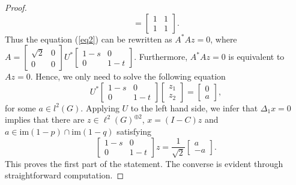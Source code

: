 \documentclass[a4paper,leqno,12pt]{article}
\numberwithin{equation}{section}
\theoremstyle{plain}
\theoremstyle{definition}
\theoremstyle{remark}
\begin{document}
\begin{proof}
\[		=
		\begin{bmatrix}1 & 1 \\ 1 & 1\end{bmatrix}.
		\]
		Thus the equation (\ref{eq2}) can be rewritten as 
		$A^*Az=0$, where 
		$
		A =
		\begin{bmatrix}\sqrt 2 & 0 \\ 0 & 0\end{bmatrix}U^*\begin{bmatrix}1-s & 0 \\ 0 & 1-t\end{bmatrix}
		$.
		Furthermore, $A^*Az=0$ is equivalent to 
		$Az=0$. 
		Hence, we only need to solve the following equation
		\[
		U^*
		\begin{bmatrix} {1-s} & 0 \\ 0 & {1-t} 
		\end{bmatrix}\begin{bmatrix} z_1 \\ z_2 \end{bmatrix}
		=
		\begin{bmatrix} 0 \\ a
		\end{bmatrix},
		\]
		for some $a \in l^2(G)$.
		Applying $U$ to the left hand side, we infer that $\Delta_1x=0$ implies that there are $z\in \ell^2(G)^{\oplus 2}$, $x=(I-C)z$ and $a\in\mathrm{im}(1-p)\cap\mathrm{im}(1-q)$ satisfying
		\[
			\begin{bmatrix}1-s & 0 \\ 0 & {1-t}\end{bmatrix}z
			=
			\frac{1}{\sqrt 2}\begin{bmatrix}a\\-a
			\end{bmatrix}. 
		\] 
		This proves the first part of the statement.
		The converse is evident through straightforward computation.
		\end{proof}
\end{document}
